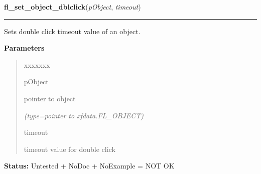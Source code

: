 \hspace{.8\funcindent}\begin{boxedminipage}{\funcwidth}

    \raggedright \textbf{fl\_set\_object\_dblclick}(\textit{pObject}, \textit{timeout})

    \vspace{-1.5ex}

    \rule{\textwidth}{0.5\fboxrule}
\setlength{\parskip}{2ex}
    Sets double click timeout value of an object.

\setlength{\parskip}{1ex}
      \textbf{Parameters}
      \vspace{-1ex}

      \begin{quote}
        \begin{Ventry}{xxxxxxx}

          \item[pObject]

          pointer to object

            {\it (type=pointer to xfdata.FL\_OBJECT)}

          \item[timeout]

          timeout value for double click

        \end{Ventry}

      \end{quote}

\textbf{Status:} Untested + NoDoc + NoExample = NOT OK



    \end{boxedminipage}

    \label{xformslib:library:fl_get_object_dblclick}

    \vspace{0.5ex}


